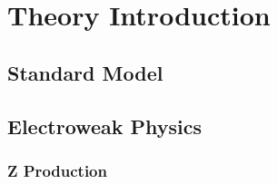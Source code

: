 \chapter{Theory Introduction}
\section{Standard Model}
\section{Electroweak Physics}
\subsection{Z Production}
